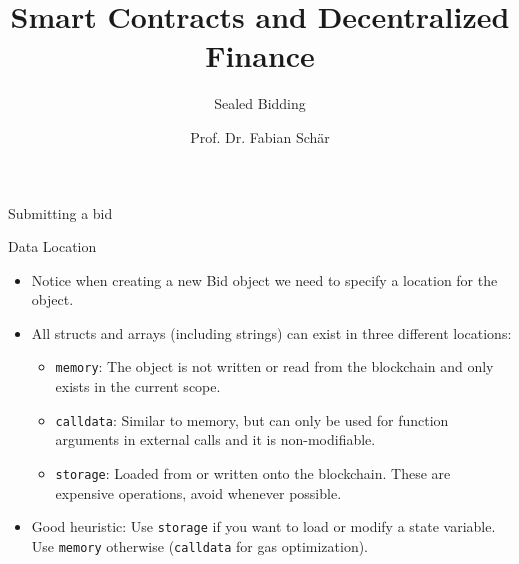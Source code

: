 \documentclass[]{beamer}
\title{Smart Contracts and Decentralized Finance}
\subtitle{Sealed Bidding}
\author{Prof. Dr. Fabian Sch\"ar}
\institute{University of Basel}
\begin{document}
\thispagestyle{empty}
\begin{frame}[noframenumbering]
	\titlepage
\end{frame}

\begin{frame}{Submitting a bid}
\vspace{.3cm}

\end{frame}

\begin{frame}{Data Location}
	\begin{itemize}
		\item Notice when creating a new Bid object we need to specify a location for the object.
		\item<2-> All structs and arrays (including strings) can exist in three different locations:
			\begin{itemize}
			\item<3-> \texttt{memory}: The object is not written or read from the blockchain and only exists in the current scope.
			\item<4-> \texttt{calldata}: Similar to memory, but can only be used for function arguments in external calls and it is non-modifiable.
			\item<5-> \texttt{storage}: Loaded from or written onto the blockchain. These are expensive operations, avoid whenever possible.
			\end{itemize}

		\item<6-> Good heuristic: Use \texttt{storage} if you want to load or modify a state variable. Use \texttt{memory} otherwise (\texttt{calldata} for gas optimization).
		\end{itemize}
\end{frame}
\end{document}
